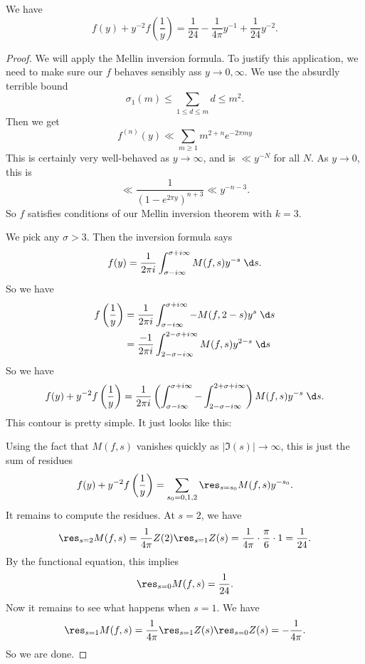 \documentclass[a4paper]{article}
\begin{document}
\begin{thm}
  We have
  \[
    f(y) + y^{-2} f\left(\frac{1}{y}\right) = \frac{1}{24} - \frac{1}{4\pi} y^{-1} + \frac{1}{24} y^{-2}.
  \]
\end{thm}

\begin{proof}
  We will apply the Mellin inversion formula. To justify this application, we need to make sure our $f$ behaves sensibly ass $y \to 0, \infty$. We use the absurdly terrible bound
  \[
    \sigma_1(m) \leq \sum_{1 \leq d \leq m} d \leq m^2.
  \]
  Then we get
  \[
    f^{(n)}(y) \ll \sum_{m \geq 1} m^{2 + n} e^{-2\pi m y}
  \]
  This is certainly very well-behaved as $y \to \infty$, and is $\ll y^{-N}$ for all $N$. As $y \to 0$, this is
  \[
    \ll \frac{1}{(1 - e^{2\pi y})^{n + 3}} \ll y^{-n - 3}.
  \]
  So $f$ satisfies conditions of our Mellin inversion theorem with $k = 3$.

  We pick any $\sigma > 3$. Then the inversion formula says
  \[
    f(y) = \frac{1}{2\pi i} \int_{\sigma - i \infty}^{\sigma + i \infty} M(f, s) y^{-s}\;\d s.
  \]
  So we have
  \begin{align*}
    f\left(\frac{1}{y}\right) &= \frac{1}{2\pi i} \int_{\sigma - i \infty}^{\sigma + i \infty} - M(f, 2 - s) y^s \;\d s\\
    &= \frac{-1}{2\pi i} \int_{2 - \sigma - i \infty}^{2 - \sigma + i \infty}M(f, s) y^{2 - s}\;\d s
  \end{align*}
  So we have
  \[
    f(y) + y^{-2} f\left(\frac{1}{y}\right) = \frac{1}{2\pi i} \left(\int_{\sigma - i \infty}^{\sigma + i \infty} - \int_{2 - \sigma - i \infty}^{2 + \sigma + i \infty}\right) M(f, s) y^{-s}\;\d s.
  \]
  This contour is pretty simple. It just looks like this:
  \begin{center}
  \end{center}
  Using the fact that $M(f, s)$ vanishes quickly as $|\Im (s)| \to \infty$, this is just the sum of residues
  \[
    f(y) + y^{-2} f\left(\frac{1}{y}\right) = \sum_{s_0 = 0, 1, 2} \res_{s = s_0} M(f, s) y^{-s_0}.
  \]
  It remains to compute the residues. At $s = 2$, we have
  \[
    \res_{s = 2} M(f, s) = \frac{1}{4\pi} Z(2) \res_{s = 1}Z(s) = \frac{1}{4\pi}\cdot \frac{\pi}{6} \cdot 1 = \frac{1}{24}.
  \]
  By the functional equation, this implies
  \[
    \res_{s = 0} M(f, s) = \frac{1}{24}.
  \]
  Now it remains to see what happens when $s = 1$. We have
  \[
    \res_{s = 1} M(f, s) = \frac{1}{4\pi} \res_{s = 1} Z(s) \res_{s = 0}Z(s) = -\frac{1}{4\pi}.
  \]
  So we are done.
\end{proof}
\end{document}

